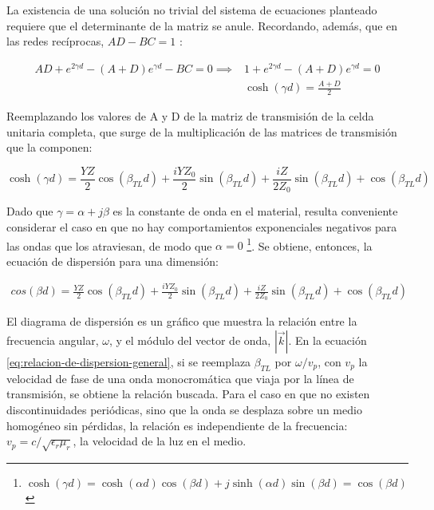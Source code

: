 La existencia de una solución no trivial del sistema de ecuaciones planteado requiere que el determinante de la matriz se anule. Recordando, además, que en las redes recíprocas, $AD-BC=1$ \cite{Pozar:MwEngineering}:

\begin{subequations}
	\begin{align}
		AD + e^{2 \gamma d} - (A+D)e^{\gamma d}-BC = 0 \implies &1+e^{2\gamma d}-(A+D)e^{\gamma d} = 0 \\
		&\cosh (\gamma d) = \frac{A+D}{2}
	\end{align}
\end{subequations}

Reemplazando los valores de A y D de la matriz de transmisión de la celda unitaria completa, que surge de la multiplicación de las matrices de transmisión que la componen:

\begin{equation}
\cosh (\gamma d) = \frac{Y Z}{2} \cos{\left (\beta_{TL} d \right )} + \frac{i Y Z_{0}}{2} \sin{\left (\beta_{TL} d \right )} + \frac{i Z}{2 Z_{0}} \sin{\left (\beta_{TL} d \right )} + \cos{\left (\beta_{TL} d \right )}
\end{equation}

Dado que $\gamma = \alpha + j \beta$ es la constante de onda en el material, resulta conveniente considerar el caso en que no hay comportamientos exponenciales negativos para las ondas que los atraviesan, de modo que $\alpha=0$ \footnote{$\cosh (\gamma d) = \cosh(\alpha d)\cos(\beta d) + j \sinh(\alpha d) \sin(\beta d) = \cos (\beta d)$}. Se obtiene, entonces, la ecuación de dispersión para una dimensión:

\begin{align}
	\label{eq:relacion-de-dispersion-general}
	cos(\beta d) = \frac{Y Z}{2} \cos{\left (\beta_{TL} d \right )} + \frac{i Y Z_{0}}{2} \sin{\left (\beta_{TL} d \right )} + \frac{i Z}{2 Z_{0}} \sin{\left (\beta_{TL} d \right )} + \cos{\left (\beta_{TL} d \right )}
\end{align}

El diagrama de dispersión es un gráfico que muestra la relación entre la frecuencia angular, $\omega$, y el módulo del vector de onda, $|\vec{k}|$. En la ecuación \ref{eq:relacion-de-dispersion-general}, si se reemplaza $\beta_{TL}$ por $\omega/v_p$, con $v_p$ la velocidad de fase de una onda monocromática que viaja por la línea de transmisión, se obtiene la relación buscada. Para el caso en que no existen discontinuidades periódicas, sino que la onda se desplaza sobre un medio homogéneo sin pérdidas, la relación es independiente de la frecuencia: $v_p = c/\sqrt{\epsilon_r \mu_r}$, la velocidad de la luz en el medio.

